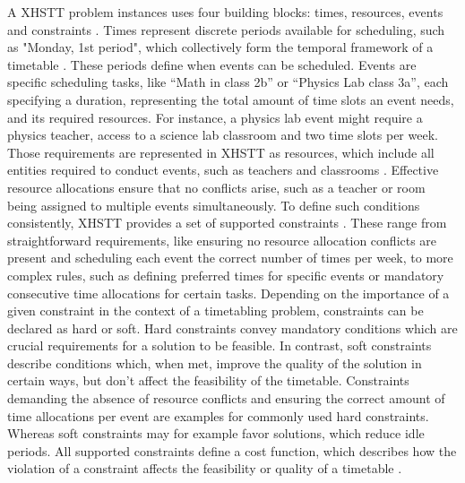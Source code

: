 \documentclass[english,examples]{isasthesis}
\begin{document}
A XHSTT problem instances uses four building blocks: times, resources,
events and constraints \cite{Post2014,xhsttDocs}.
%
Times represent discrete periods available for scheduling, such as "Monday,
1st period", which collectively form the temporal framework of a timetable
\cite{xhsttDocs}.
These periods define when events can be scheduled.
%
Events are specific scheduling tasks, like \enquote{Math in class 2b} or
\enquote{Physics Lab class 3a}, each specifying a duration, representing the
total amount of time slots an event needs, and its required resources.
For instance, a physics lab event might require a physics teacher, access to a
science lab classroom and two time slots per week.
%
Those requirements are represented in XHSTT as resources, which include
all entities required to conduct events, such as teachers and classrooms
\cite{xhsttDocs}.
Effective resource allocations ensure that no conflicts arise, such as a
teacher or room being assigned to multiple events simultaneously.
%
To define such conditions consistently, XHSTT provides a set of supported
constraints \cite{xhsttDocs}.
These range from straightforward requirements, like ensuring
no resource allocation conflicts are present and scheduling each event the
correct number of times per week, to more complex rules, such as defining
preferred times for specific events or mandatory consecutive time allocations
for certain tasks. Depending on the importance of a given constraint in the
context of a timetabling problem, constraints can be declared as hard or soft.
Hard constraints convey mandatory conditions which are crucial requirements
for a solution to be feasible. In contrast, soft constraints describe conditions
which, when met, improve the quality of the solution in certain ways, but
don't affect the feasibility of the timetable. Constraints demanding the absence
of resource conflicts and ensuring the correct amount of time allocations per
event are examples for commonly used hard constraints. Whereas soft constraints
may for example favor solutions, which reduce idle periods.
All supported constraints define a cost function, which describes how the
violation of a constraint affects the feasibility or quality of a timetable
\cite{xhsttDocs,Post2014}.
\end{document}
